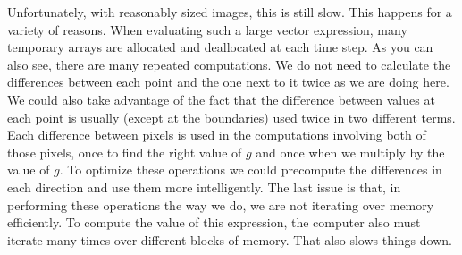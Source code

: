 Unfortunately, with reasonably sized images, this is still slow.
This happens for a variety of reasons.
When evaluating such a large vector expression, many temporary arrays are allocated and deallocated at each time step.
As you can also see, there are many repeated computations.
We do not need to calculate the differences between each point and the one next to it twice as we are doing here.
We could also take advantage of the fact that the difference between values at each point is usually (except at the boundaries) used twice in two different terms.
Each difference between pixels is used in the computations involving both of those pixels, once to find the right value of $g$ and once when we multiply by the value of $g$.
To optimize these operations we could precompute the differences in each direction and use them more intelligently.
The last issue is that, in performing these operations the way we do, we are not iterating over memory efficiently.
To compute the value of this expression, the computer also must iterate many times over different blocks of memory.
That also slows things down.

